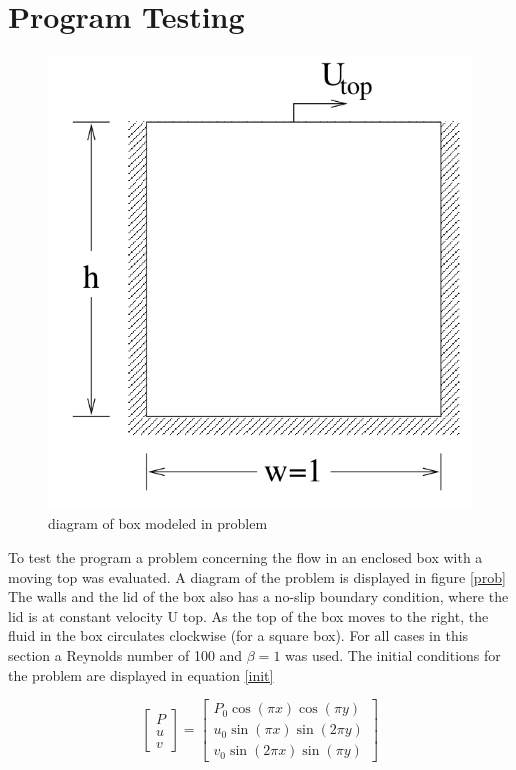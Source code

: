 \documentclass[paper=a4, fontsize=11pt, abstract=on]{scrartcl}
\numberwithin{equation}{section}		%
\numberwithin{figure}{section}			%
\numberwithin{table}{section}				%
\begin{document}
\section{Program Testing}

\begin{figure}[H]
\centering
\includegraphics[width=0.65\linewidth]{box}
\caption{diagram of box modeled in problem}
\label{fluxo}
\end{figure}

To test the program a problem concerning the flow in an enclosed box with a
moving top was evaluated. A diagram of the problem is displayed in figure \ref{prob} The walls and the lid of the box also has a no-slip boundary condition, where the lid is at constant velocity U top. As the top of the box moves to the right, the fluid in the box circulates clockwise (for a square box). For all cases in this section a Reynolds number of 100 and $\beta = 1$ was used. The initial conditions for the problem are displayed in equation \ref{init}

\begin{equation}
\label{init}
\begin{bmatrix}
   P    \\
   u  \\
    v
\end{bmatrix} =
\begin{bmatrix}
   P_0\cos(\pi x)\cos(\pi y)   \\
   u_0\sin(\pi x)\sin(2\pi y)  \\
    v_0\sin(2\pi x)\sin(\pi y)
\end{bmatrix}
\end{equation} 
\end{document}
